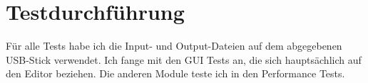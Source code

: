 \section{Testdurchführung}
Für alle Tests habe ich die Input- und Output-Dateien auf dem abgegebenen USB-Stick verwendet. Ich fange mit den GUI Tests an, die sich hauptsächlich auf den Editor beziehen. Die anderen Module teste ich in den Performance Tests. 



